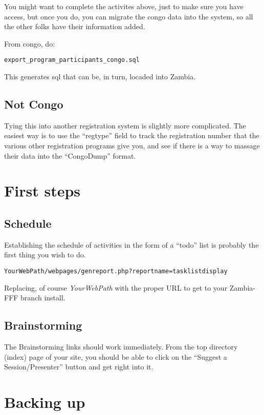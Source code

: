 \documentclass[tablesignature]{scrartcl}
\begin{document}
   You might want to complete the activites above, just to make sure
   you have access, but once you do, you can migrate the congo data
   into the system, so all the other folks have their information
   added.

   From congo, do:
\begin{verbatim}
export_program_participants_congo.sql
\end{verbatim}



   This generates sql that can be, in turn, locaded into Zambia.
\subsection{Not Congo}
\label{sec-7_3}

   Tying this into another registration system is slightly more
   complicated.  The easiest way is to use the ``regtype'' field to
   track the registration number that the various other registration
   programs give you, and see if there is a way to massage their data
   into the ``CongoDump'' format.
\section{First steps}
\label{sec-8}
\subsection{Schedule}
\label{sec-8_1}

   Establishing the schedule of activities in the form of a ``todo''
   list is probably the first thing you wish to do.

\begin{verbatim}
YourWebPath/webpages/genreport.php?reportname=tasklistdisplay
\end{verbatim}



   Replacing, of course \emph{YourWebPath} with the proper URL to get to
   your Zambia-FFF branch install.
\subsection{Brainstorming}
\label{sec-8_2}

   The Brainstorming links should work immediately.  From the top
   directory (index) page of your site, you should be able to click on
   the ``Suggest a Session/Presenter'' button and get right into it.
\section{Backing up}
\label{sec-9}
\end{document}
